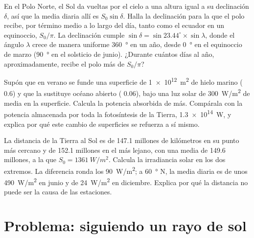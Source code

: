 \begin{exercise}[$\star\star\star$]\label{exo:g10:earth-energy-budget:13}
En el Polo Norte, el Sol da vueltas por el cielo a una altura igual a su
declinación $\delta$, así que la  media diaria allí es $S_0 \sin
\delta$. Halla la declinación para la que el polo recibe, por término medio
a lo largo del día, tanto como el ecuador en un equinoccio, $S_0/\pi$. La
declinación cumple $\sin\delta = \sin 23.44^\circ \times \sin\lambda$, donde
el ángulo $\lambda$ crece de manera uniforme \qty{360}{\degree} en un año,
desde \qty{0}{\degree} en el equinoccio de marzo (\qty{90}{\degree} en el
solsticio de junio). ¿Durante cuántos días al año, aproximadamente, recibe
el polo más de $S_0/\pi$?
\end{exercise}

\begin{exercise}[$\star\star\star$]\label{exo:g10:earth-energy-budget:14}
Supón que en verano se funde una superficie de \qty{1e12}{m^2} de hielo
marino ( 0.6) y que la sustituye océano abierto ( 0.06), bajo una
luz solar de \qty{300}{W/m^2} de media en la superficie. Calcula la potencia
absorbida de más. Compárala con la potencia almacenada por toda la
fotosíntesis de la Tierra, \qty{1.3e14}{W}, y explica por qué este cambio de
superficies se refuerza a sí mismo.
\end{exercise}

\begin{exercise}[$\star\star\star$]\label{exo:g10:earth-energy-budget:15}
La distancia de la Tierra al Sol es de \num{147.1} millones de kilómetros en
su punto más cercano y de \num{152.1} millones en el más lejano, con una
media de \num{149.6} millones, a la que $S_0 = \qty{1361}{W/m^2}$. Calcula la
irradiancia solar en los dos extremos. La diferencia ronda los
\qty{90}{W/m^2}; a \qty{60}{\degree} N, la  media diaria es de unos
\qty{490}{W/m^2} en junio y de \qty{24}{W/m^2} en diciembre. Explica por qué
la distancia no puede ser la causa de las estaciones.
\end{exercise}

\section{Problema: siguiendo un rayo de sol}

